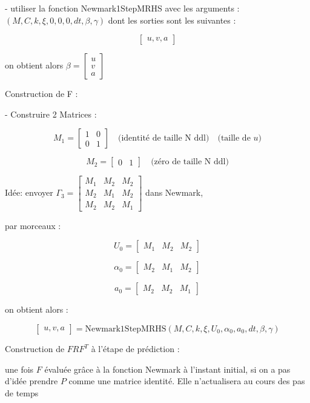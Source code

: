 \documentclass{rapportECL}
\begin{document}
- utiliser la fonction Newmark1StepMRHS avec les arguments : $(M, C, k, \xi, 0, 0, 0, dt, \beta, \gamma)$ dont les sorties sont les suivantes :

\[ \begin{bmatrix} u, v, a \end{bmatrix} \]

on obtient alors $\beta = \begin{bmatrix} u \\ v \\ a \end{bmatrix}$

Construction de F :

- Construire 2 Matrices :

\[ M_1 = \begin{bmatrix} 1 & 0 \\ 0 & 1 \end{bmatrix} \quad \text{(identit\'e de taille N ddl)} \quad \text{(taille de } u) \]

\[ M_2 = \begin{bmatrix} 0 & 1 \end{bmatrix} \quad \text{(z\'ero de taille N ddl)} \]

Id\'ee: envoyer $\Gamma_3 = \begin{bmatrix} M_1 & M_2 & M_2 \\ M_2 & M_1 & M_2 \\ M_2 & M_2 & M_1 \end{bmatrix}$ dans Newmark,

par morceaux :

\[ U_0 = \begin{bmatrix} M_1 & M_2 & M_2 \end{bmatrix} \]

\[ \alpha_0 = \begin{bmatrix} M_2 & M_1 & M_2 \end{bmatrix} \]

\[ a_0 = \begin{bmatrix} M_2 & M_2 & M_1 \end{bmatrix} \]

on obtient alors :

\[ \begin{bmatrix} u, v, a \end{bmatrix} = \text{Newmark1StepMRHS}(M, C, k, \xi, U_0, \alpha_0, a_0, dt, \beta, \gamma) \]

Construction de $FRF^T$ \`a l'\'etape de pr\'ediction :

une fois $F$ \'evalu\'ee gr\^ace \`a la fonction Newmark \`a l'instant initial, si on a pas d'id\'ee prendre $P$ comme une matrice identit\'e. Elle n'actualisera au cours des pas de temps
\end{document}
